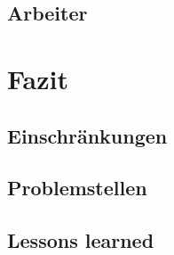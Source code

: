 \documentclass[ngerman, 12pt, pdftex]{scrartcl}[2006/07/30]
\begin{document}

\subsection{Arbeiter}



\section{Fazit}
\subsection{Einschränkungen}

\subsection{Problemstellen}

\subsection{Lessons learned}


\end{document}
